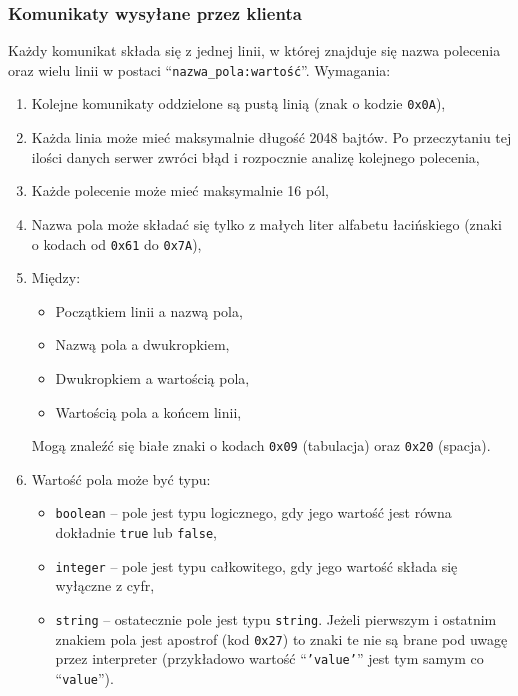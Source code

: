 \documentclass[8pt,a4paper]{article}
\newcommand{\quotes}[1]{``#1''}
\newcommand{\quotcode}[1]{\quotes{\texttt{#1}}}
\begin{document}
\subsubsection{Komunikaty wysyłane przez klienta}
Każdy komunikat składa się z jednej linii, w której znajduje się nazwa polecenia oraz wielu linii w postaci \quotcode{nazwa\_pola:wartość}. Wymagania:
\begin{enumerate}
    \item Kolejne komunikaty oddzielone są pustą linią (znak o kodzie \texttt{0x0A}),
    \item Każda linia może mieć maksymalnie długość 2048 bajtów. Po przeczytaniu tej ilości danych serwer zwróci błąd i rozpocznie analizę kolejnego polecenia,
    \item Każde polecenie może mieć maksymalnie 16 pól,
    \item Nazwa pola może składać się tylko z małych liter alfabetu łacińskiego (znaki o kodach od \texttt{0x61} do \texttt{0x7A}),
    \item Między:
        \begin{itemize}
            \item Początkiem linii a nazwą pola,
            \item Nazwą pola a dwukropkiem,
            \item Dwukropkiem a wartością pola,
            \item Wartością pola a końcem linii,
        \end{itemize}
        Mogą znaleźć się białe znaki o kodach \texttt{0x09} (tabulacja) oraz \texttt{0x20} (spacja).
    \item Wartość pola może być typu:
        \begin{itemize}
            \item \texttt{boolean} -- pole jest typu logicznego, gdy jego wartość jest równa dokładnie \texttt{true} lub \texttt{false},
            \item \texttt{integer} -- pole jest typu całkowitego, gdy jego wartość składa się wyłączne z cyfr,
            \item \texttt{string} -- ostatecznie pole jest typu \texttt{string}. Jeżeli pierwszym i ostatnim znakiem pola jest apostrof (kod \texttt{0x27}) to znaki te nie są brane pod uwagę przez interpreter (przykładowo wartość \quotcode{'value'} jest tym samym co \quotcode{value}).
        \end{itemize}
\end{enumerate}
\end{document}
